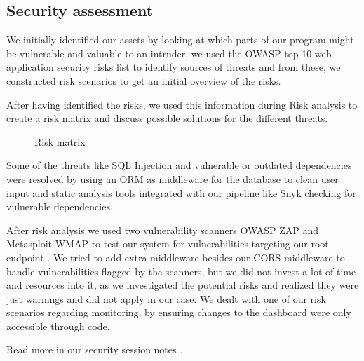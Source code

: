 \subsection{Security assessment}
We initially identified our assets by looking at which parts of our program might be vulnerable and valuable to an intruder, 
we used the OWASP top 10 web application security risks list \cite{owasp-top-10} to identify sources of threats and from these, we constructed risk scenarios to get an initial overview of the risks.

After having identified the risks, we used this information during Risk analysis to create a risk matrix and discuss possible solutions for the different threats. 


\begin{wrapfigure}{R}{0.38\paperwidth}
    \hspace*{0.35in}
    \caption{Risk matrix}
    \label{fig:Risk-matrix}
\end{wrapfigure}

Some of the threats like SQL Injection and vulnerable or outdated dependencies were resolved by using an ORM \cite{gorm} as middleware for the database to clean user input and static analysis tools integrated with our pipeline like Snyk \cite{snyk} checking for vulnerable dependencies.

After risk analysis we used two vulnerability scanners OWASP ZAP \cite{tool:owasp-zap} and Metasploit \cite{metasploit} WMAP \cite{metasploit-wmap} to test our system for vulnerabilities targeting our root endpoint \cite{minitwit-root-endpoint}.
We tried to add extra middleware besides our CORS middleware to handle vulnerabilities flagged by the scanners, but we did not invest a lot of time and resources into it, as we investigated the potential risks and realized they were just warnings and did not apply in our case.
We dealt with one of our risk scenarios regarding monitoring, by ensuring changes to the dashboard were only accessible through code.

Read more in our security session notes \cite{repo:security-session-notes}.
